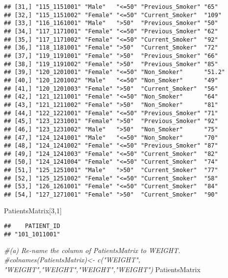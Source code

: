 \documentclass[
]{article}
\newenvironment{Shaded}{\begin{snugshade}}{\end{snugshade}}
\newcommand{\CommentTok}[1]{\textcolor[rgb]{0.56,0.35,0.01}{\textit{#1}}}
\newcommand{\DecValTok}[1]{\textcolor[rgb]{0.00,0.00,0.81}{#1}}
\newcommand{\NormalTok}[1]{#1}
\begin{document}
\begin{verbatim}
## [31,] "115_1151001" "Male"   "<=50" "Previous_Smoker" "65"   
## [32,] "115_1151002" "Female" "<=50" "Current_Smoker"  "109"  
## [33,] "116_1161001" "Male"   ">50"  "Previous_Smoker" "50"   
## [34,] "117_1171001" "Female" "<=50" "Previous_Smoker" "62"   
## [35,] "117_1171002" "Female" "<=50" "Current_Smoker"  "92"   
## [36,] "118_1181001" "Female" ">50"  "Current_Smoker"  "72"   
## [37,] "119_1191001" "Female" ">50"  "Previous_Smoker" "66"   
## [38,] "119_1191002" "Female" ">50"  "Previous_Smoker" "85"   
## [39,] "120_1201001" "Female" "<=50" "Non_Smoker"      "51.2" 
## [40,] "120_1201002" "Male"   "<=50" "Non_Smoker"      "49"   
## [41,] "120_1201003" "Female" ">50"  "Current_Smoker"  "56"   
## [42,] "121_1211001" "Female" "<=50" "Non_Smoker"      "64"   
## [43,] "121_1211002" "Female" ">50"  "Non_Smoker"      "81"   
## [44,] "122_1221001" "Female" "<=50" "Previous_Smoker" "71"   
## [45,] "123_1231001" "Female" ">50"  "Previous_Smoker" "92"   
## [46,] "123_1231002" "Male"   ">50"  "Non_Smoker"      "75"   
## [47,] "124_1241001" "Male"   "<=50" "Non_Smoker"      "70"   
## [48,] "124_1241002" "Female" "<=50" "Previous_Smoker" "87"   
## [49,] "124_1241003" "Female" "<=50" "Current_Smoker"  "82"   
## [50,] "124_1241004" "Female" "<=50" "Current_Smoker"  "74"   
## [51,] "125_1251001" "Male"   ">50"  "Current_Smoker"  "77"   
## [52,] "125_1251002" "Female" "<=50" "Current_Smoker"  "58"   
## [53,] "126_1261001" "Female" "<=50" "Current_Smoker"  "84"   
## [54,] "127_1271001" "Female" ">50"  "Current_Smoker"  "90"
\end{verbatim}

\begin{Shaded}
\begin{Highlighting}[]
\NormalTok{PatientsMatrix[}\DecValTok{3}\NormalTok{,}\DecValTok{1}\NormalTok{]}
\end{Highlighting}
\end{Shaded}

\begin{verbatim}
##    PATIENT_ID 
## "101_1011001"
\end{verbatim}

\begin{Shaded}
\begin{Highlighting}[]
\CommentTok{\#(a) Re{-}name the column of PatientsMatrix to WEIGHT.}
\CommentTok{\#colnames(PatientsMatrix)\textless{}{-} c("WEIGHT", "WEIGHT","WEIGHT","WEIGHT","WEIGHT")}
\NormalTok{PatientsMatrix}
\end{Highlighting}
\end{Shaded}
\end{document}
